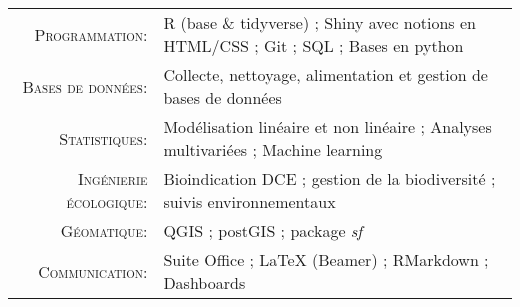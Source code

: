 \documentclass[localFont,alternative]{yaac-another-awesome-cv}
\begin{document}
\makecvheader

\renewcommand{\arraystretch}{1.1}

	\begin{tabular}{>{}r>{}p{13cm}} 
		\textsc{Programmation:}              &    R (base \& tidyverse) ; Shiny avec notions en HTML/CSS  ; Git ; SQL ; Bases en python\\ 
		\textsc{Bases de données:}               	&   Collecte, nettoyage, alimentation et gestion de bases de données \\ 
		\textsc{Statistiques:}  	 &   Modélisation linéaire et non linéaire ;  Analyses multivariées ; Machine learning \\
		\textsc{Ingénierie écologique:}              &    Bioindication DCE ; gestion de la biodiversité ; suivis environnementaux \\
		\textsc{Géomatique:}			&   QGIS ; postGIS ; package \textit{sf} \\ 
		\textsc{Communication:}               	&  Suite Office ; LaTeX (Beamer) ; RMarkdown ; Dashboards 
	\end{tabular}
	
\end{document}
